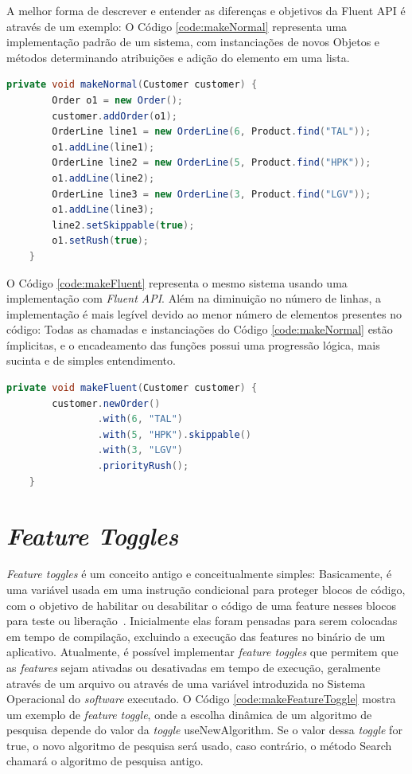 \documentclass[portugues]{ic-tese}
\begin{document}
A melhor forma de descrever e entender as diferenças e objetivos da Fluent API é através de um exemplo: O Código \ref{code:makeNormal} representa uma implementação padrão de um sistema, com instanciações de novos Objetos e métodos determinando atribuições e adição do elemento em uma lista.

\begin{lstlisting}[language=Java, label={code:makeNormal}, caption=Implementação padrão presente em um sistema~\citep{Fowler_2005}]
    private void makeNormal(Customer customer) {
        Order o1 = new Order();
        customer.addOrder(o1);
        OrderLine line1 = new OrderLine(6, Product.find("TAL"));
        o1.addLine(line1);
        OrderLine line2 = new OrderLine(5, Product.find("HPK"));
        o1.addLine(line2);
        OrderLine line3 = new OrderLine(3, Product.find("LGV"));
        o1.addLine(line3);
        line2.setSkippable(true);
        o1.setRush(true);
    }
\end{lstlisting}

O Código \ref{code:makeFluent} representa o mesmo sistema usando uma implementação com \textit{Fluent API}. Além na diminuição no número de linhas, a implementação é mais legível devido ao menor número de elementos presentes no código: Todas as chamadas e instanciações do Código \ref{code:makeNormal} estão ímplicitas, e o encadeamento das funções possui uma progressão lógica, mais sucinta e de simples entendimento.

\begin{lstlisting}[language=Java, label={code:makeFluent}, caption=Implementação com o uso de \textit{Fluent API}~\citep{Fowler_2005}]
   private void makeFluent(Customer customer) {
        customer.newOrder()
                .with(6, "TAL")
                .with(5, "HPK").skippable()
                .with(3, "LGV")
                .priorityRush();
    }
\end{lstlisting}

\section{\textit{Feature Toggles}}
\label{app:FeatureToggles}

\textit{Feature toggles} é um conceito antigo e conceitualmente simples: Basicamente, é uma variável usada em uma instrução condicional para proteger blocos de código, com o objetivo de habilitar ou desabilitar o código de uma feature nesses blocos para teste ou liberação~\citep{Rahman_2016}. Inicialmente elas foram pensadas para serem colocadas em tempo de compilação, excluindo a execução das features no binário de um aplicativo. Atualmente, é possível implementar \textit{feature toggles} que permitem que as \textit{features} sejam ativadas ou desativadas em tempo de execução, geralmente através de um arquivo ou através de uma variável introduzida no Sistema Operacional do \textit{software} executado. O Código \ref{code:makeFeatureToggle} mostra um exemplo de \textit{feature toggle}, onde a escolha dinâmica de um algoritmo de pesquisa depende do valor da \textit{toggle} useNewAlgorithm. Se o valor dessa \textit{toggle} for true, o novo algoritmo de pesquisa será usado, caso contrário, o método Search chamará o algoritmo de pesquisa antigo.
\end{document}
